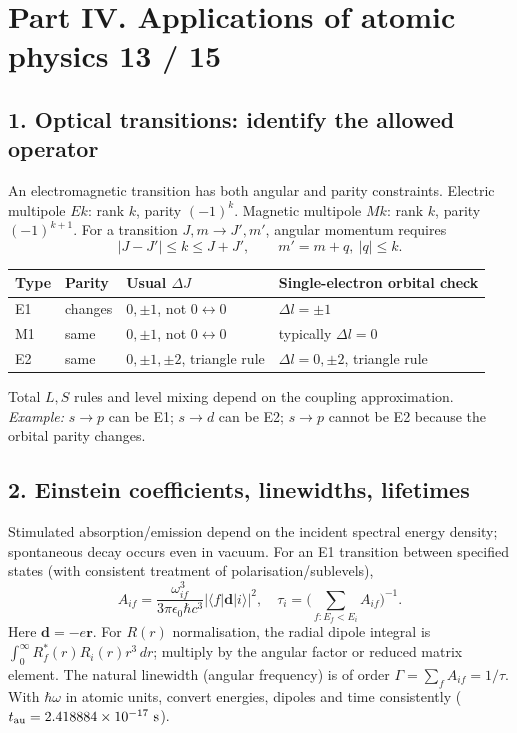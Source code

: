 
\section*{Part IV. Applications of atomic physics \hfill 13 / 15}
\subsection*{1. Optical transitions: identify the allowed operator}
An electromagnetic transition has both angular and parity constraints.
Electric multipole \(Ek\): rank \(k\), parity \((-1)^k\).
Magnetic multipole \(Mk\): rank \(k\), parity \((-1)^{k+1}\).
For a transition \(J,m\to J',m'\), angular momentum requires
\[
\boxed{|J-J'|\le k\le J+J',\qquad
m'=m+q,\ |q|\le k.}
\]
\begin{center}\small
\begin{tabular}{@{}llll@{}}\toprule
Type & Parity & Usual \(\Delta J\) & Single-electron orbital check\\\midrule
E1 & changes & \(0,\pm1\), not \(0\leftrightarrow0\) & \(\Delta l=\pm1\)\\
M1 & same & \(0,\pm1\), not \(0\leftrightarrow0\) & typically \(\Delta l=0\)\\
E2 & same & \(0,\pm1,\pm2\), triangle rule & \(\Delta l=0,\pm2\), triangle rule\\\bottomrule
\end{tabular}
\end{center}
Total \(L,S\) rules and level mixing depend on the coupling
approximation. \emph{Example:} \(s\to p\) can be E1;
\(s\to d\) can be E2; \(s\to p\) cannot be E2
because the orbital parity changes.

\subsection*{2. Einstein coefficients, linewidths, lifetimes}
Stimulated absorption/emission depend on the incident spectral
energy density; spontaneous decay occurs even in vacuum.
For an E1 transition between specified states (with
consistent treatment of polarisation/sublevels),
\[
\boxed{A_{if}=
\frac{\omega_{if}^3}{3\pi\epsilon_0\hbar c^3}
|\langle f|\mathbf d|i\rangle|^2,\quad
\tau_i=\Big(\sum_{f:E_f<E_i}A_{if}\Big)^{-1}.}
\]
Here \(\mathbf d=-e\mathbf r\).
For \(R(r)\) normalisation, the radial dipole integral is
\(\int_0^\infty R_f^*(r)R_i(r)r^3\,dr\);
multiply by the angular factor or reduced matrix element.
The natural linewidth (angular frequency) is of order
\(\Gamma=\sum_fA_{if}=1/\tau\).
With \(\hbar\omega\) in atomic units, convert
energies, dipoles and time consistently
(\(t_{\rm au}=2.418884\times10^{-17}\ {\rm s}\)).

